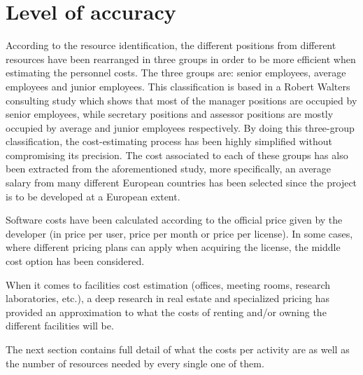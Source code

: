 \section{Level of accuracy}

According to the resource identification, the different positions from different resources have been rearranged in three groups in order to be more efficient when estimating the personnel costs. The three groups are: senior employees, average employees and junior employees. This classification is based in a Robert Walters consulting study \cite{solarSurvey} which shows that most of the manager positions are occupied by senior employees, while secretary positions and assessor positions are mostly occupied by average and junior employees respectively. By doing this three-group classification, the cost-estimating process has been highly simplified without compromising its precision. The cost associated to each of these groups has also been extracted from the aforementioned study, more specifically, an average salary from many different European countries has been selected since the project is to be developed at a European extent.

Software costs have been calculated according to the official price given by the developer (in price per user, price per month or price per license). In some cases, where different pricing plans can apply when acquiring the license, the middle cost option has been considered.   

When it comes to facilities cost estimation (offices, meeting rooms, research laboratories, etc.), a deep research in real estate and specialized pricing has provided an approximation to what the costs of renting and/or owning the different facilities will be.

The next section contains full detail of what the costs per activity are as well as the number of resources needed by every single one of them. 

